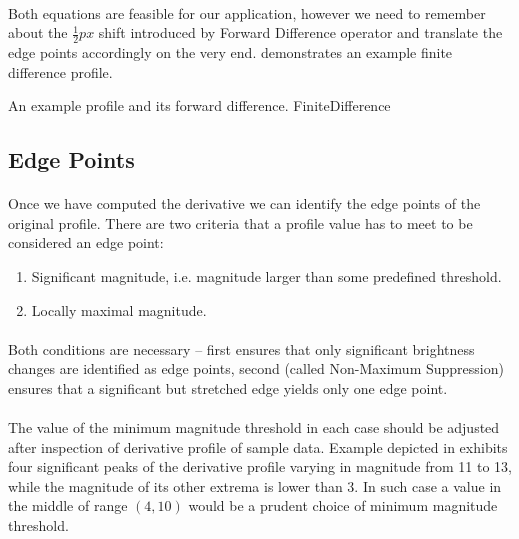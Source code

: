 \paragraph*{}
Both equations are feasible for our application, however we need to remember about the $\frac{1}{2}px$ shift introduced by Forward Difference operator and translate the edge points accordingly on the very end. 
 demonstrates an example finite difference profile.

\profileFigure
{
}
{An example profile and its forward difference.}
{FiniteDifference}


\subsection{Edge Points}
\paragraph*{}
Once we have computed the derivative we can identify the edge points of the original profile. There are two criteria that a profile value has to meet to be considered an edge point:
\begin{enumerate}
	\item Significant magnitude, i.e. magnitude larger than some predefined threshold.
	\item Locally maximal magnitude.
\end{enumerate}

\paragraph*{}
Both conditions are necessary -- first ensures that only significant brightness changes are identified as edge points, second (called Non-Maximum Suppression) ensures that a significant but stretched edge yields only one edge point.

\paragraph*{}
The value of the minimum magnitude threshold in each case should be adjusted after inspection of derivative profile of sample data. Example depicted in  exhibits four significant peaks of the derivative profile varying in magnitude from 11 to 13, while the magnitude of its other extrema is lower than 3. In such case a value in the middle of range $(4, 10)$ would be a prudent choice of minimum magnitude threshold.

